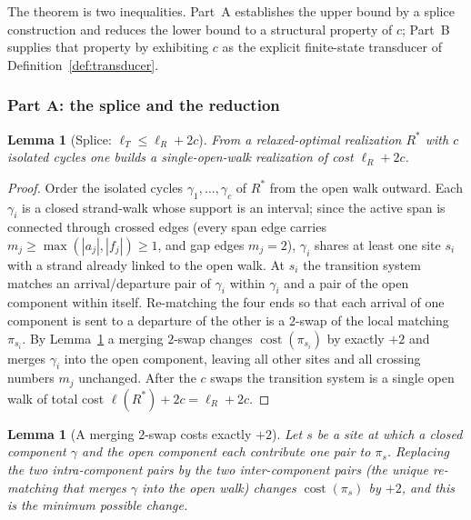 \documentclass[11pt]{article}
\theoremstyle{plain}
\newtheorem{lemma}[theorem]{Lemma}
\theoremstyle{definition}
\theoremstyle{remark}
\begin{document}
The theorem is two inequalities. Part~A establishes the upper bound by a splice
construction and reduces the lower bound to a structural property of $c$;
Part~B supplies that property by exhibiting $c$ as the explicit finite-state
transducer of Definition~\ref{def:transducer}.

\subsubsection*{Part A: the splice and the reduction}

\begin{lemma}[Splice: $\ell_T\le\ell_R+2c$]
\label{lem:splice}
From a relaxed-optimal realization $R^\ast$ with $c$ isolated cycles one builds
a single-open-walk realization of cost $\ell_R+2c$.
\end{lemma}

\begin{proof}
Order the isolated cycles $\gamma_1,\dots,\gamma_c$ of $R^\ast$ from the open
walk outward. Each $\gamma_i$ is a closed strand-walk whose support is an
interval; since the active span is connected through crossed edges (every span
edge carries $m_j\ge\max(|a_j|,|f_j|)\ge1$, and gap edges $m_j=2$), $\gamma_i$
shares at least one site $s_i$ with a strand already linked to the open walk.
At $s_i$ the transition system matches an arrival/departure pair of $\gamma_i$
within $\gamma_i$ and a pair of the open component within itself. Re-matching
the four ends so that each arrival of one component is sent to a departure of
the other is a $2$-swap of the local matching $\pi_{s_i}$. By
Lemma~\ref{lem:swap} a merging $2$-swap changes $\operatorname{cost}(\pi_{s_i})$
by exactly $+2$ and merges $\gamma_i$ into the open component, leaving all other
sites and all crossing numbers $m_j$ unchanged. After the $c$ swaps the
transition system is a single open walk of total cost
$\ell(R^\ast)+2c=\ell_R+2c$.
\end{proof}

\begin{lemma}[A merging $2$-swap costs exactly $+2$]
\label{lem:swap}
Let $s$ be a site at which a closed component $\gamma$ and the open component
each contribute one pair to $\pi_s$. Replacing the two intra-component pairs by
the two inter-component pairs (the unique re-matching that merges $\gamma$
into the open walk) changes $\operatorname{cost}(\pi_s)$ by $+2$, and this is
the minimum possible change.
\end{lemma}
\end{document}
